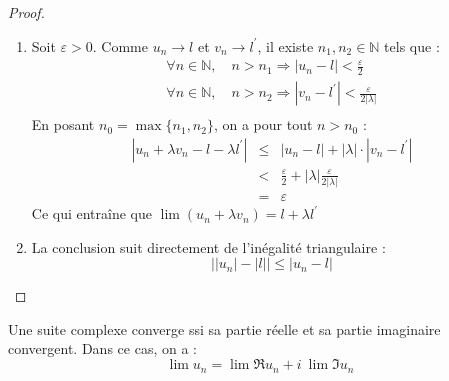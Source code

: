     \begin{proof}
        \ \\
        \begin{enumerate}[label=(\roman*)]
            \item Soit \(\varepsilon>0\). Comme \(u_n\to l\) et \(v_n \to l^{\prime}\), il existe \(n_1, n_2 \in \mathbb{N}\) tels que :
            \[
                \begin{array}{l}
                    \forall n \in \mathbb{N},\quad n > n_1 \Rightarrow |u_n - l| < \frac{\varepsilon}{2}\\
                    \forall n \in \mathbb{N},\quad n > n_2 \Rightarrow |v_n - l^{\prime}| < \frac{\varepsilon}{2|\lambda|}\\
                \end{array}    
            \]
            En posant \(n_0 = \max{\{n_1, n_2\}}\), on a pour tout \(n>n_0\) :
            \[
                \begin{array}{lcl}
                    |u_n + \lambda v_n - l - \lambda l^{\prime}| &\le& |u_n  - l| + |\lambda|\cdot|v_n - l^{\prime}|\\
                     &<& \frac{\varepsilon}{2} + |\lambda|\frac{\varepsilon}{2|\lambda|}\\
                     &=& \varepsilon
                \end{array}
            \]
            Ce qui entraîne que \(\lim (u_n + \lambda v_n) = l + \lambda l^{\prime}\) 
            
            \item La conclusion suit directement de l'inégalité triangulaire : \[\Big| |u_n| - |l| \Big| \le |u_n - l|\]
        \end{enumerate}
    \end{proof}

    \begin{corollary}
        Une suite complexe converge ssi sa partie réelle et sa partie imaginaire convergent. Dans ce cas, on a :
        \[\lim u_n = \lim \Re{u_n} + i\ \lim\Im{u_n}\] 
    \end{corollary}